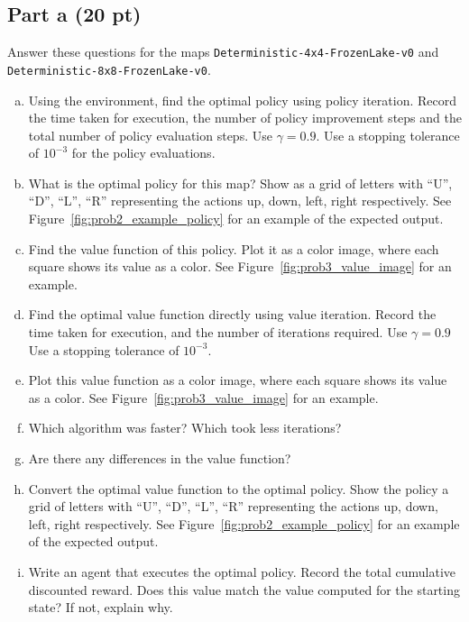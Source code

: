\documentclass[12pt]{article}
\begin{document}
\subsection*{Part a (20 pt)}

Answer these questions for the maps
\texttt{Deterministic-4x4-FrozenLake-v0} and \\
\texttt{Deterministic-8x8-FrozenLake-v0}.

\begin{enumerate}[a)]
\item Using the environment, find the optimal policy using policy
  iteration. Record the time taken for execution, the number of policy
  improvement steps and the total number of policy evaluation
  steps. Use $\gamma=0.9$. Use a stopping tolerance of
  $10^{-3}$ for the policy evaluations.
\item What is the optimal policy for this map? Show as a grid of
  letters with ``U'', ``D'', ``L'', ``R'' representing the actions up,
  down, left, right respectively. See
  Figure~\ref{fig:prob2_example_policy} for an example of the expected
  output.  
\item Find the value function of this policy. Plot it as a color
  image, where each square shows its value as a color. See
  Figure~\ref{fig:prob3_value_image} for an example.
\item Find the optimal value function directly using value
  iteration. Record the time taken for execution, and the number of
  iterations required. Use $\gamma=0.9$ Use a stopping tolerance of
  $10^{-3}$.
\item Plot this value function as a color image, where each square
  shows its value as a color. See Figure~\ref{fig:prob3_value_image}
  for an example.
\item Which algorithm was faster? Which took less iterations?
\item Are there any differences in the value function?
\item Convert the optimal value function to the optimal policy. Show
  the policy a grid of letters with ``U'', ``D'', ``L'', ``R''
  representing the actions up, down, left, right respectively. See
  Figure~\ref{fig:prob2_example_policy} for an example of the expected
  output.
\item Write an agent that executes the optimal policy. Record the
  total cumulative discounted reward. Does this value match the value
  computed for the starting state? If not, explain why.
\end{enumerate}
\end{document}
